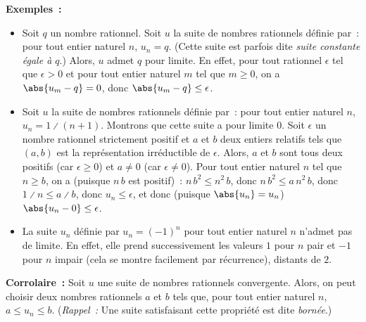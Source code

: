 \medskip

\noindent\textbf{Exemples :} 
\begin{itemize}[nosep]
    \item Soit $q$ un nombre rationnel. 
        Soit $u$ la suite de nombres rationnels définie par : pour tout entier naturel $n$, $u_n = q$. 
        (Cette suite est parfois dite \emph{suite constante égale à $q$}.)
        Alors, $u$ admet $q$ pour limite.
        En effet, pour tout rationnel $\epsilon$ tel que $\epsilon > 0$ et pour tout entier naturel $m$ tel que $m \geq 0$, on a $\abs{u_m - q} = 0$, donc $\abs{u_m - q} \leq \epsilon$.
    \item Soit $u$ la suite de nombres rationnels définie par : pour tout entier naturel $n$, $u_n = 1 \divslash (n+1)$.
        Montrons que cette suite a pour limite $0$. 
        Soit $\epsilon$ un nombre rationnel strictement positif et $a$ et $b$ deux entiers relatifs tels que $(a, b)$ est la représentation irréductible de $\epsilon$.
        Alors, $a$ et $b$ sont tous deux positifs (car $\epsilon \geq 0$) et $a \neq 0$ (car $\epsilon \neq 0$).
        Pour tout entier naturel $n$ tel que $n \geq b$, on a (puisque $n \, b$ est positif) : $n \, b^2 \leq n^2 \, b$, donc $n \, b^2 \leq a \, n^2 \, b$, donc $1 \divslash n \leq a \divslash b$, donc $u_n \leq \epsilon$, et donc (puisque $\abs{u_n} = u_n$) $\abs{u_n - 0} \leq \epsilon$.
    \item La suite $u_n$ définie par $u_n = (-1)^n$ pour tout entier naturel $n$ n'admet pas de limite.
        En effet, elle prend successivement les valeurs $1$ pour $n$ pair et $-1$ pour $n$ impair (cela se montre facilement par récurrence), distants de $2$. 
\end{itemize}

\medskip

\noindent\textbf{Corrolaire :} Soit $u$ une suite de nombres rationnels convergente.
    Alors, on peut choisir deux nombres rationnels $a$ et $b$ tels que, pour tout entier naturel $n$, $a \leq u_n \leq b$.
    (\emph{Rappel :} Une suite satisfaisant cette propriété est dite \emph{bornée}.)

\medskip

